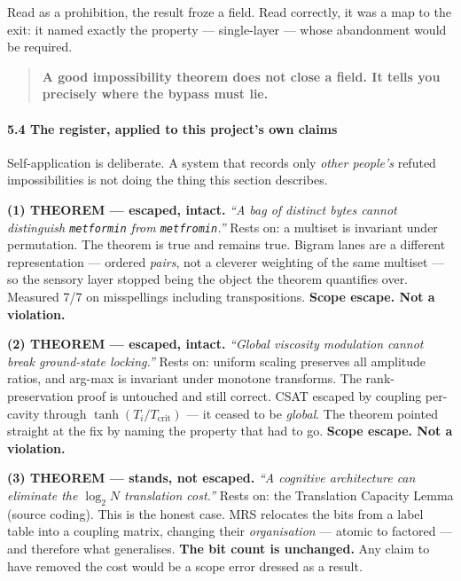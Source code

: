 \documentclass[
  11pt,
  a4paper,
]{article}
\begin{document}
Read as a prohibition, the result froze a field. Read correctly, it was
a map to the exit: it named exactly the property --- single-layer ---
whose abandonment would be required.

\begin{quote}
\textbf{A good impossibility theorem does not close a field. It tells
you precisely where the bypass must lie.}
\end{quote}

\paragraph{5.4 The register, applied to this project's own
claims}\label{the-register-applied-to-this-projects-own-claims}

Self-application is deliberate. A system that records only \emph{other
people's} refuted impossibilities is not doing the thing this section
describes.

\textbf{(1) THEOREM --- escaped, intact.} \emph{``A bag of distinct
bytes cannot distinguish \texttt{metformin} from \texttt{metfromin}.''}
Rests on: a multiset is invariant under permutation. The theorem is true
and remains true. Bigram lanes are a different representation ---
ordered \emph{pairs}, not a cleverer weighting of the same multiset ---
so the sensory layer stopped being the object the theorem quantifies
over. Measured 7/7 on misspellings including transpositions.
\textbf{Scope escape. Not a violation.}

\textbf{(2) THEOREM --- escaped, intact.} \emph{``Global viscosity
modulation cannot break ground-state locking.''} Rests on: uniform
scaling preserves all amplitude ratios, and arg-max is invariant under
monotone transforms. The rank-preservation proof is untouched and still
correct. CSAT escaped by coupling per-cavity through
\(\tanh(T_i/T_{\text{crit}})\) --- it ceased to be \emph{global}. The
theorem pointed straight at the fix by naming the property that had to
go. \textbf{Scope escape. Not a violation.}

\textbf{(3) THEOREM --- stands, not escaped.} \emph{``A cognitive
architecture can eliminate the \(\log_2 N\) translation cost.''} Rests
on: the Translation Capacity Lemma (source coding). This is the honest
case. MRS relocates the bits from a label table into a coupling matrix,
changing their \emph{organisation} --- atomic to factored --- and
therefore what generalises. \textbf{The bit count is unchanged.} Any
claim to have removed the cost would be a scope error dressed as a
result.
\end{document}
